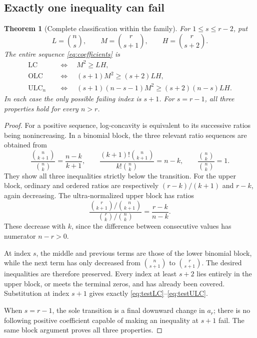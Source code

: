 \documentclass[11pt,letterpaper]{article}
\numberwithin{equation}{section}
\newtheorem{theorem}{Theorem}[section]
\theoremstyle{definition}
\theoremstyle{remark}
\newcommand{\LC}{\mathrm{LC}}
\newcommand{\OLC}{\mathrm{OLC}}
\newcommand{\ULC}{\mathrm{ULC}}
\begin{document}
\subsection{Exactly one inequality can fail}
\begin{theorem}[Complete classification within the family]\label{thm:shapes}
For $1\le s\le r-2$, put
\[
 L=\binom ns,\qquad M=\binom r{s+1},\qquad H=\binom r{s+2}.
\]
The entire sequence \eqref{eq:coefficients} is
\begin{align}
 \LC &\quad\Longleftrightarrow\quad M^2\ge LH,\label{eq:testLC}\\
 \OLC &\quad\Longleftrightarrow\quad (s+1)M^2\ge(s+2)LH,\label{eq:testOLC}\\
 \ULC_n &\quad\Longleftrightarrow\quad
 (s+1)(n-s-1)M^2\ge(s+2)(n-s)LH.\label{eq:testULC}
\end{align}
In each case the only possible failing index is $s+1$.
For $s=r-1$, all three properties hold for every $n>r$.
\end{theorem}
\begin{proof}
For a positive sequence, log-concavity is equivalent to its successive
ratios being nonincreasing. In a binomial block, the three relevant ratio
sequences are obtained from
\[
 \frac{\binom n{k+1}}{\binom nk}=\frac{n-k}{k+1},\qquad
 \frac{(k+1)!\binom n{k+1}}{k!\binom nk}=n-k,\qquad
 \frac{\binom nk}{\binom nk}=1.
\]
They show all three inequalities strictly below the transition. For the
upper block, ordinary and ordered ratios are respectively
$(r-k)/(k+1)$ and $r-k$, again decreasing. The ultra-normalized upper block
has ratios
\begin{equation}\label{eq:upper-ratio}
 \frac{\binom r{k+1}/\binom n{k+1}}{\binom rk/\binom nk}
 =\frac{r-k}{n-k}.
\end{equation}
These decrease with $k$, since the difference between consecutive values
has numerator $n-r>0$.

At index $s$, the middle and previous terms are those of the lower binomial
block, while the next term has only decreased from $\binom n{s+1}$ to
$\binom r{s+1}$. The desired inequalities are therefore preserved.
Every index at least $s+2$ lies entirely in the upper block, or meets the
terminal zeros, and has already been covered. Substitution at index $s+1$
gives exactly \eqref{eq:testLC}--\eqref{eq:testULC}.

When $s=r-1$, the sole transition is a final downward change in $a_r$;
there is no following positive coefficient capable of making an inequality
at $s+1$ fail. The same block argument proves all three properties.
\end{proof}
\end{document}
